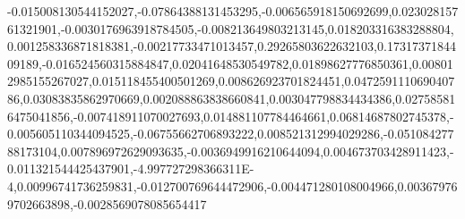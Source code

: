 -0.015008130544152027,-0.07864388131453295,-0.006565918150692699,0.02302815761321901,-0.0030176963918784505,-0.008213649803213145,0.018203316383288804,0.001258336871818381,-0.00217733471013457,0.29265803622632103,0.1731737184409189,-0.016524560315884847,0.02041648530549782,0.01898627776850361,0.008012985155267027,0.015118455400501269,0.008626923701824451,0.047259111069040786,0.03083835862970669,0.002088863838660841,0.003047798834434386,0.027585816475041856,-0.007418911070027693,0.014881107784464661,0.06814687802745378,-0.005605110344094525,-0.06755662706893222,0.008521312994029286,-0.05108427788173104,0.007896972629093635,-0.0036949916210644094,0.004673703428911423,-0.011321544425437901,-4.997727298366311E-4,0.00996741736259831,-0.012700769644472906,-0.004471280108004966,0.003679769702663898,-0.0028569078085654417